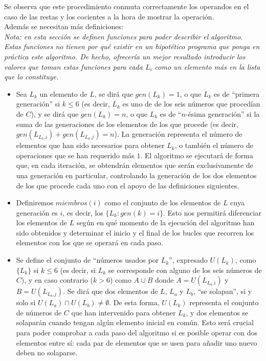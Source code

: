 Se observa que este procedimiento conmuta correctamente los operandos en el caso
de las restas y los cocientes a la hora de mostrar la operación. \\

Además se necesitan más definiciones:\\
\emph{Nota: en esta sección se definen funciones para poder describir el algoritmo.
Estas funciones no tienen por qué existir en un hipotético programa que ponga en
práctica este algoritmo. De hecho, ofrecería un mejor resultado introducir los
valores que toman estas funciones para cada $L_i$ como un elemento más en la
lista que lo constituye.}
\begin{itemize}
	\item Sea $L_k$ un elemento de $L$, se dirá que $gen(L_k) = 1$, o que $L_k$ es
	de ``primera generación'' si $k \le 6$ (es decir, $L_k$ es uno de de los seis
	números que procedían de $C$), y se dirá que $gen(L_k) = n$, o que $L_k$ es
	de ``$n$-ésima generación'' si la suma de las generaciones de los elementos
	de los que procede (es decir, $gen(L_{L_k.i}) + gen(L_{L_k.j}) = n$).
	La generación representa el número de elementos que han sido necesarios
	para obtener $L_k$, o también el número de operaciones que se han
	requerido más $1$.
	El algoritmo se ejecutará de forma que, en cada iteración, se obtendrán
	elementos que serán exclusivamente de una generación en particular,
	controlando la generación de los dos elementos de los que procede cada uno con
	el apoyo de las definiciones siguientes.

	\item Definiremos $miembros(i)$ como el conjunto de los elementos de $L$ cuya
	generación es $i$, es decir, los $\{L_k : gen(k) = i\}$. Esto nos permitirá
	diferenciar los elementos de $L$ según en qué momento de la ejecución del
	algoritmo han sido obtenidos y determinar el inicio y el final de los bucles
	que recorren los elementos con los que se operará en cada paso.

	\item Se define el conjunto de ``números usados por $L_k$'', expresado
	$U(L_k)$, como $\{L_k\}$ si $k \le 6$ (es decir, si $L_k$ se corresponde con
	alguno de los seis números de $C$), y en caso contrario ($k > 6$) como
	$A \cup B$ donde $A =U(L_{L_k.i})$ y $B = U(L_{L_k.j})$. Se dirá que dos
	elementos de $L$, $L_a$ y $L_b$, ``se solapan'', si y solo si
	$U(L_a) \cap  U(L_b) \ne \emptyset$.
	De esta forma, $U(L_k)$ representa el conjunto de números de $C$ que han
	intervenido para obtener $L_k$, y dos elementos se solaparán cuando tengan
	algún elemento inicial en común. Esto será crucial para poder comprobar a cada
	paso del algoritmo si es posible operar con dos elementos entre sí: cada par
	de elementos que se usen para añadir uno nuevo deben no solaparse.

\end{itemize}

